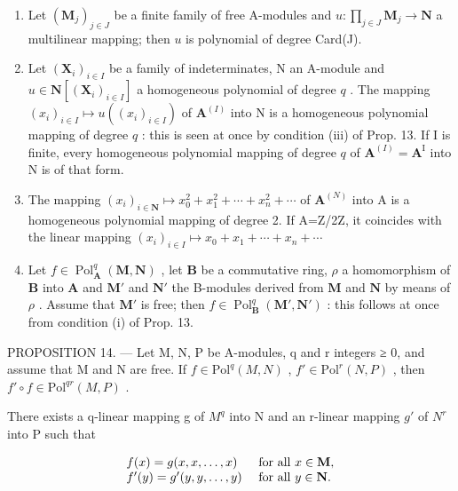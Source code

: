 \begin{enumerate}
\def\labelenumi{\arabic{enumi})}
\setcounter{enumi}{2}
\item
  Let \((\mathbf{M}_j)_{j\in J}\) be a finite family of free A-modules and \(u:\prod_{j\in J}\mathbf{M}_j\to \mathbf{N}\) a multilinear mapping; then \(u\) is polynomial of degree Card(J).
\item
  Let \((\mathbf{X}_i)_{i\in I}\) be a family of indeterminates, N an A-module and \(u\in \mathbf{N}[(\mathbf{X}_i)_{i\in I}]\) a homogeneous polynomial of degree \(q\) . The mapping \((x_{i})_{i\in I}\mapsto u((x_{i})_{i\in I})\) of \(\mathbf{A}^{(I)}\) into N is a homogeneous polynomial mapping of degree \(q\) : this is seen at once by condition (iii) of Prop. 13. If I is finite, every homogeneous polynomial mapping of degree \(q\) of \(\mathbf{A}^{(I)} = \mathbf{A}^{\mathrm{I}}\) into N is of that form.
\item
  The mapping \((x_{i})_{i\in\mathbf{N}}\mapsto x_{0}^{2}+x_{1}^{2}+\cdots+x_{n}^{2}+\cdots\) of \(\mathbf{A}^{(N)}\) into A is a homogeneous polynomial mapping of degree 2. If A=Z/2Z, it coincides with the linear mapping \((x_{i})_{i\in I}\mapsto x_{0}+x_{1}+\cdots+x_{n}+\cdots\)
\item
  Let \(f \in \operatorname{Pol}_{\mathbf{A}}^{q}(\mathbf{M}, \mathbf{N})\) , let \(\mathbf{B}\) be a commutative ring, \(\rho\) a homomorphism of \(\mathbf{B}\) into \(\mathbf{A}\) and \(\mathbf{M}'\) and \(\mathbf{N}'\) the B-modules derived from \(\mathbf{M}\) and \(\mathbf{N}\) by means of \(\rho\) . Assume that \(\mathbf{M}'\) is free; then \(f \in \operatorname{Pol}_{\mathbf{B}}^{q}(\mathbf{M}', \mathbf{N}')\) : this follows at once from condition (i) of Prop. 13.
\end{enumerate}

PROPOSITION 14. --- Let M, N, P be A-modules, q and r integers ≥ 0, and assume that M and N are free. If \(f \in \text{Pol}^{q}(M, N)\) , \(f' \in \text{Pol}^{r}(N, P)\) , then \(f' \circ f \in \text{Pol}^{qr}(M, P)\) .

There exists a q-linear mapping g of \(M^{q}\) into N and an r-linear mapping \(g'\) of \(N^{r}\) into P such that

\[
\begin{array}{l l} f (x) = g (x, x, \dots , x) & \text { for   all } x \in \mathbf {M}, \\ f ^ {\prime} (y) = g ^ {\prime} (y, y, \dots , y) & \text { for   all } y \in \mathbf {N}. \end{array}
\]

